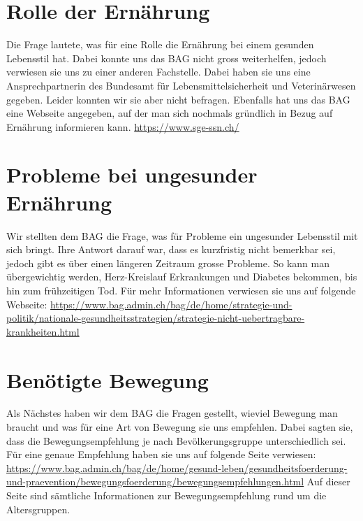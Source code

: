 \section{Rolle der Ernährung}
Die Frage lautete, was für eine Rolle die Ernährung bei einem gesunden Lebensstil hat. Dabei konnte uns das BAG nicht gross weiterhelfen, jedoch verwiesen sie uns zu einer anderen Fachstelle. Dabei haben sie uns eine Ansprechpartnerin des  Bundesamt für Lebensmittelsicherheit und Veterinärwesen gegeben. Leider konnten wir sie aber nicht befragen. Ebenfalls hat uns das BAG eine Webseite angegeben, auf der man sich nochmals gründlich in Bezug auf Ernährung informieren kann.
\newline
\url{https://www.sge-ssn.ch/}
\section{Probleme bei ungesunder Ernährung}
Wir stellten dem BAG die Frage, was für Probleme ein ungesunder Lebensstil mit sich bringt. Ihre Antwort darauf war, dass es kurzfristig nicht bemerkbar sei, jedoch gibt es über einen längeren Zeitraum grosse Probleme. So kann man übergewichtig werden, Herz-Kreislauf Erkrankungen und Diabetes bekommen, bis hin zum frühzeitigen Tod. Für mehr Informationen verwiesen sie uns auf folgende Webseite: 
\newline
\url{https://www.bag.admin.ch/bag/de/home/strategie-und-politik/nationale-gesundheitsstrategien/strategie-nicht-uebertragbare-krankheiten.html}
\section{Benötigte Bewegung}
Als Nächstes haben wir dem BAG die Fragen gestellt, wieviel Bewegung man braucht und was für eine Art von Bewegung sie uns empfehlen. Dabei sagten sie, dass die Bewegungsempfehlung je nach Bevölkerungsgruppe unterschiedlich sei. Für eine genaue Empfehlung haben sie uns auf folgende Seite verwiesen:
\newline
\url{https://www.bag.admin.ch/bag/de/home/gesund-leben/gesundheitsfoerderung-und-praevention/bewegungsfoerderung/bewegungsempfehlungen.html}
\newline
Auf dieser Seite sind sämtliche Informationen zur Bewegungsempfehlung rund um die Altersgruppen. 
